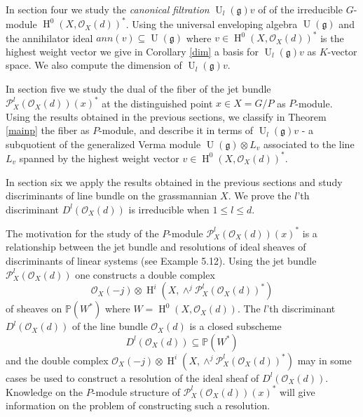 \documentclass{amsart}
\theoremstyle{plain}
\theoremstyle{definition}
\theoremstyle{remark}
\numberwithin{equation}{theorem}
\begin{document}
In section four we study the \emph{canonical filtration} ${\operatorname{U}}_l({\mathfrak{g}})v$ of
of the irreducible $G$-module ${\operatorname{H} }^0(X,{\mathcal{O} }_X(d))^*$. Using
the universal enveloping algebra
${\operatorname{U}}({\mathfrak{g}})$ and the annihilator ideal $ann(v)\subseteq {\operatorname{U}}({\mathfrak{g}})$ where $v\in {\operatorname{H} }^0(X,{\mathcal{O} }_X(d))^*$
is the highest weight vector we give in Corollary \ref{dim} a basis for ${\operatorname{U}}_l({\mathfrak{g}})v$ as
$K$-vector space. We also compute the dimension of ${\operatorname{U}}_l({\mathfrak{g}})v$.

In section five we study the dual of the fiber of the jet bundle
${\mathcal{P} }^l_X({\mathcal{O} }_X(d))(x)^*$ at the distinguished point $x\in X=G/P$ as $P$-module. 
Using the results obtained in the previous sections, we classify in
Theorem \ref{mainp} the fiber as $P$-module, and describe it in terms
of ${\operatorname{U}}_l({\mathfrak{g}})v$ - a subquotient of the generalized Verma module ${\operatorname{U}}({\mathfrak{g}})\otimes L_v$
associated to the line $L_v$ spanned by the highest weight vector $v\in {\operatorname{H} }^0(X,{\mathcal{O} }_X(d))^*$.

In section six we apply the results obtained in the previous sections
and study discriminants of line bundle on the grassmannian $X$. 
We prove the $l$'th discriminant $D^l({\mathcal{O} }_X(d))$ is irreducible
when $1\leq l \leq d$.

The motivation for the study of the $P$-module ${\mathcal{P} }^l_X({\mathcal{O} }_X(d))(x)^*$
is a relationship between the jet bundle and resolutions of ideal sheaves
of discriminants of linear systems  (see \cite{maa10} Example 5.12). Using the jet
bundle ${\mathcal{P} }^l_X({\mathcal{O} }_X(d))$ one constructs a double complex
\[ {\mathcal{O} }_X(-j)\otimes {\operatorname{H} }^i(X,\wedge^j{\mathcal{P} }^l_X({\mathcal{O} }_X(d))^*) \]
of sheaves on ${\mathbb{P}}(W^*)$ where $W={\operatorname{H} }^0(X,{\mathcal{O} }_X(d))$.
The $l$'th discriminant
$D^l({\mathcal{O} }_X(d))$ of the line bundle ${\mathcal{O} }_X(d)$ is a closed subscheme
\[ D^l({\mathcal{O} }_X(d))\subseteq {\mathbb{P}}(W^*) \]
and the double complex ${\mathcal{O} }_X(-j)\otimes
{\operatorname{H} }^i(X,\wedge^j{\mathcal{P} }^l_X({\mathcal{O} }_X(d))^*) $ may in some cases be used to construct a resolution
of the ideal sheaf of $D^l({\mathcal{O} }_X(d))$. Knowledge on the $P$-module
structure of ${\mathcal{P} }^l_X({\mathcal{O} }_X(d))(x)^*$ will give information on the
problem of constructing such a resolution.
\end{document}
